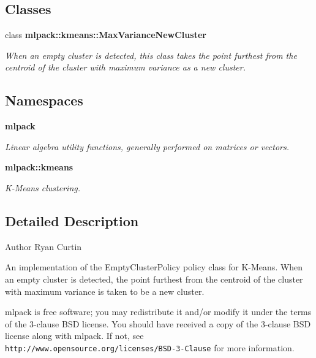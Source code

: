 \subsection*{Classes}
\begin{DoxyCompactItemize}
\item 
class {\bf mlpack\+::kmeans\+::\+Max\+Variance\+New\+Cluster}
\begin{DoxyCompactList}\small\item\em When an empty cluster is detected, this class takes the point furthest from the centroid of the cluster with maximum variance as a new cluster. \end{DoxyCompactList}\end{DoxyCompactItemize}
\subsection*{Namespaces}
\begin{DoxyCompactItemize}
\item 
 {\bf mlpack}
\begin{DoxyCompactList}\small\item\em Linear algebra utility functions, generally performed on matrices or vectors. \end{DoxyCompactList}\item 
 {\bf mlpack\+::kmeans}
\begin{DoxyCompactList}\small\item\em K-\/\+Means clustering. \end{DoxyCompactList}\end{DoxyCompactItemize}


\subsection{Detailed Description}
\begin{DoxyAuthor}{Author}
Ryan Curtin
\end{DoxyAuthor}
An implementation of the Empty\+Cluster\+Policy policy class for K-\/\+Means. When an empty cluster is detected, the point furthest from the centroid of the cluster with maximum variance is taken to be a new cluster.

mlpack is free software; you may redistribute it and/or modify it under the terms of the 3-\/clause B\+SD license. You should have received a copy of the 3-\/clause B\+SD license along with mlpack. If not, see {\tt http\+://www.\+opensource.\+org/licenses/\+B\+S\+D-\/3-\/\+Clause} for more information. 